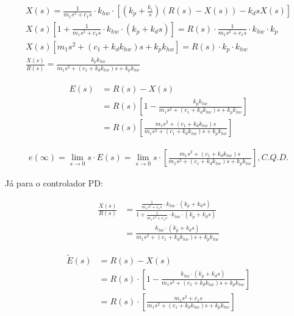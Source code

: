 \documentclass[a4paper,11pt]{article}
\begin{document}
\begin{gather*}
    X\left(s\right) = \frac{1}{m_1 s^2 + c_1 s} \cdot k_{hw} \cdot
        \left[\left(k_p + \frac{k_i}{s}\right)\left(R\left(s\right) -
        X\left(s\right)\right) - k_d s X\left(s\right)\right] \\
    X\left(s\right) \left[ 1 + \frac{1}{m_1 s^2 + c_1 s} \cdot k_{hw} \cdot
        \left(k_p + k_d s \right) \right] =
        R\left(s\right) \cdot \frac{1}{m_1 s^2 + c_1 s} \cdot k_{hw} \cdot
        k_p \\
    X\left(s\right) \left[m_1 s^2 + \left(c_1 + k_d k_{hw}\right) s +
        k_p k_{hw}\right]
        = R\left(s\right) \cdot k_p \cdot k_{hw} \\
    \frac{X\left(s\right)}{R\left(s\right)} = \frac{k_p k_{hw}}
        {m_1 s^2 + \left(c_1 + k_d k_{hw}\right) s + k_p k_{hw}}
\end{gather*}

\begin{align*}
    E\left(s\right) &= R\left(s\right) - X\left(s\right) \\
    &= R\left(s\right) \left[1 - \frac{k_p k_{hw}}
        {m_1 s^2 + \left(c_1 + k_d k_{hw}\right) s + k_p k_{hw}}\right] \\
    &= R\left(s\right) \left[\frac{m_1 s^2 + \left(c_1 + k_d k_{hw}\right) s}
        {m_1 s^2 + \left(c_1 + k_d k_{hw}\right) s + k_p k_{hw}}\right]
\end{align*}

\begin{gather*}
    e\left(\infty\right) = \lim_{s \to 0} s \cdot E\left(s\right) =
        \lim_{s \to 0} s \cdot \left[\frac{m_1 s^2 + \left(c_1 +
        k_d k_{hw}\right) s}{m_1 s^2 + \left(c_1 + k_d k_{hw}\right) s +
        k_p k_{hw}}\right], C.Q.D.
\end{gather*}

\pagebreak

Já para o controlador PD:

\begin{align*}
    \frac{X\left(s\right)}{R\left(s\right)} &= \frac{\frac{1}{m_1 s^2 + c_1 s} \cdot
        k_{hw} \cdot \left(k_p + k_d s\right)}{1 + \frac{1}{m_1 s^2 + c_1 s} \cdot
        k_{hw} \cdot \left(k_p + k_d s\right)} \\
    &= \frac{k_{hw} \cdot \left(k_p + k_d s\right)}{m_1 s^2 + \left(c_1 +
        k_d k_{hw}\right) s + k_p k_{hw}}
\end{align*}

\begin{align*}
    \widetilde{E}\left(s\right) &= R\left(s\right) - X\left(s\right) \\
    &= R\left(s\right) \cdot \left[1 - \frac{k_{hw} \cdot \left(k_p +
        k_d s\right)}{m_1 s^2 + \left(c_1 + k_d k_{hw}\right) s + k_p k_{hw}}
        \right] \\
    &= R\left(s\right) \cdot \left[\frac{m_1 s^2 + c_1 s}{m_1 s^2 + \left(c_1 +
        k_d k_{hw}\right) s + k_p k_{hw}}\right]
\end{align*}
\end{document}
